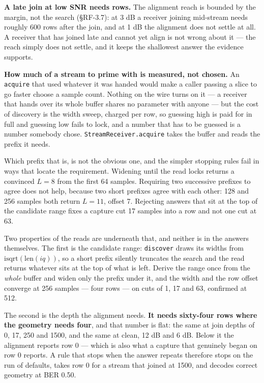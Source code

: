 \documentclass[10pt,letterpaper,twocolumn]{article}
\begin{document}
\textbf{A late join at low SNR needs rows.} The alignment reach is bounded by the margin, not the search (§RF-3.7): at 3 dB a receiver joining mid-stream needs roughly 600 rows after the join, and at 1 dB the alignment does not settle at all. A receiver that has joined late and cannot yet align is not wrong about it --- the reach simply does not settle, and it keeps the shallowest answer the evidence supports.

\textbf{How much of a stream to prime with is measured, not chosen.} An \texttt{acquire} that used whatever it was handed would make a caller passing a slice to go faster choose a sample count. Nothing on the wire turns on it --- a receiver that hands over its whole buffer shares no parameter with anyone --- but the cost of discovery is the width sweep, charged per row, so guessing high is paid for in full and guessing low fails to lock, and a number that has to be guessed is a number somebody chose. \texttt{StreamReceiver.\allowbreak{}acquire} takes the buffer and reads the prefix it needs.

Which prefix that is, is not the obvious one, and the simpler stopping rules fail in ways that locate the requirement. Widening until the read locks returns a convinced \(L=8\) from the first 64 samples. Requiring two successive prefixes to agree does not help, because two short prefixes agree with each other: 128 and 256 samples both return \(L=11\), offset 7. Rejecting answers that sit at the top of the candidate range fixes a capture cut 17 samples into a row and not one cut at 63.

Two properties of the reads are underneath that, and neither is in the answers themselves. The first is the candidate range: \texttt{discover} draws its widths from \(\mathrm{isqrt}(\mathrm{len}(iq))\), so a short prefix silently truncates the search and the read returns whatever sits at the top of what is left. Derive the range once from the \emph{whole} buffer and widen only the prefix under it, and the width and the row offset converge at 256 samples --- four rows --- on cuts of 1, 17 and 63, confirmed at 512.

The second is the depth the alignment needs. \textbf{It needs sixty-four rows where the geometry needs four}, and that number is flat: the same at join depths of 0, 17, 250 and 1500, and the same at clean, 12 dB and 6 dB. Below it the alignment reports row 0 --- which is also what a capture that genuinely began on row 0 reports. A rule that stops when the answer repeats therefore stops on the run of defaults, takes row 0 for a stream that joined at 1500, and decodes correct geometry at BER 0.50.
\end{document}
